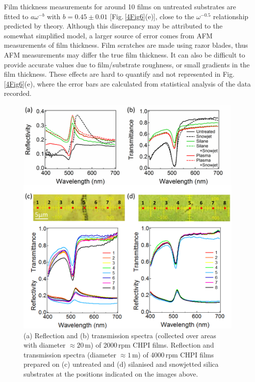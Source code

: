 Film thickness measurements for around 10 films on untreated substrates are fitted to $a\omega^{-b}$ with $b=0.45\pm0.01$ [Fig.\,\ref{4Fig6}(e)], close to the $\omega^{-0.5}$ relationship predicted by theory. Although this discrepancy may be attributed to the somewhat simplified model, a larger source of error comes from AFM measurements of film thickness. Film scratches are made using razor blades, thus AFM measurements may differ the true film thickness. It can also be difficult to provide accurate values due to film/substrate roughness, or small gradients in the film thickness. These effects are hard to quantify and not represented in Fig.\,\ref{4Fig6}(e), where the error bars are calculated from statistical analysis of the data recorded.

\begin{figure}[] 
\centering    
\includegraphics[width=\textwidth]{Fig7}
\caption{(a) Reflection and (b) transmission spectra (collected over areas with diameter $\approx 20\,$\textmu m) of 2000\,rpm CHPI films. Reflection and transmission spectra (diameter $\approx1\,$\textmu m) of 4000\,rpm CHPI films prepared on (c) untreated and (d) silanised and snowjetted silica substrates at the positions indicated on the images above.}
\label{4Fig7}
\end{figure}
